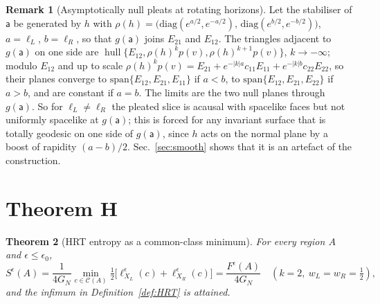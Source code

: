\documentclass[aps,prd,onecolumn,superscriptaddress,nofootinbib,amsmath,amssymb,11pt]{revtex4-2}
\newtheorem{theorem}{Theorem}[section]
\theoremstyle{definition}
\newtheorem{remark}[theorem]{Remark}
\newcommand{\Cut}{\mathcal{C}}
\newcommand{\eps}{\epsilon}
\newcommand{\hull}{\operatorname{hull}}
\begin{document}
\begin{remark}[Asymptotically null pleats at rotating horizons]\label{rem:tilt}
Let the stabiliser of $\mathsf a$ be generated by $h$ with
$\rho(h)=\big(\mathrm{diag}(e^{a/2},e^{-a/2}),\,\mathrm{diag}(e^{b/2},e^{-b/2})\big)$, $a=\ell_L$, $b=\ell_R$, so that $g(\mathsf a)$ joins $E_{21}$ and $E_{12}$. The triangles adjacent to $g(\mathsf a)$ on one side are
$\hull\{E_{12},\rho(h)^kp(v),\rho(h)^{k+1}p(v)\}$, $k\to-\infty$; modulo $E_{12}$ and up to scale
$\rho(h)^kp(v)=E_{21}+e^{-|k|a}c_{11}E_{11}+e^{-|k|b}c_{22}E_{22}$, so their planes converge to
$\mathrm{span}\{E_{12},E_{21},E_{11}\}$ if $a<b$, to $\mathrm{span}\{E_{12},E_{21},E_{22}\}$ if $a>b$, and are constant if $a=b$. The
limits are the two null planes through $g(\mathsf a)$. So for $\ell_L\ne\ell_R$ the pleated slice is acausal with spacelike faces
but not uniformly spacelike at $g(\mathsf a)$; this is forced for any invariant surface that is totally geodesic on one side of
$g(\mathsf a)$, since $h$ acts on the normal plane by a boost of rapidity $(a-b)/2$. Sec.~\ref{sec:smooth} shows that it is an
artefact of the construction.
\end{remark}

\section{Theorem H}\label{sec:thmH}

\begin{theorem}[HRT entropy as a common-class minimum]\label{thm:H}
For every region $A$ and $\eps\le\eps_0$,
\[
S^\eps(A)=\frac{1}{4G_N}\min_{c\in\Cut(A)}\tfrac12\big[\ell^\eps_{X_L}(c)+\ell^\eps_{X_R}(c)\big]=\frac{F^\eps(A)}{4G_N}
\quad(k=2,\ w_L=w_R=\tfrac12),
\]
and the infimum in Definition~\ref{def:HRT} is attained.
\end{theorem}
\end{document}
